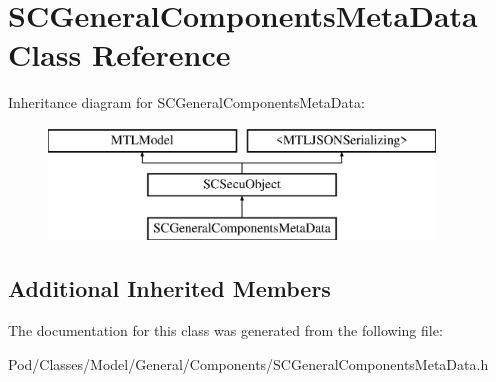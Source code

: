 \hypertarget{interface_s_c_general_components_meta_data}{}\section{S\+C\+General\+Components\+Meta\+Data Class Reference}
\label{interface_s_c_general_components_meta_data}
Inheritance diagram for S\+C\+General\+Components\+Meta\+Data\+:\begin{figure}[H]
\begin{center}
\leavevmode
\includegraphics[height=3.000000cm]{interface_s_c_general_components_meta_data}
\end{center}
\end{figure}
\subsection*{Additional Inherited Members}


The documentation for this class was generated from the following file\+:\begin{DoxyCompactItemize}
\item 
Pod/\+Classes/\+Model/\+General/\+Components/S\+C\+General\+Components\+Meta\+Data.\+h\end{DoxyCompactItemize}
